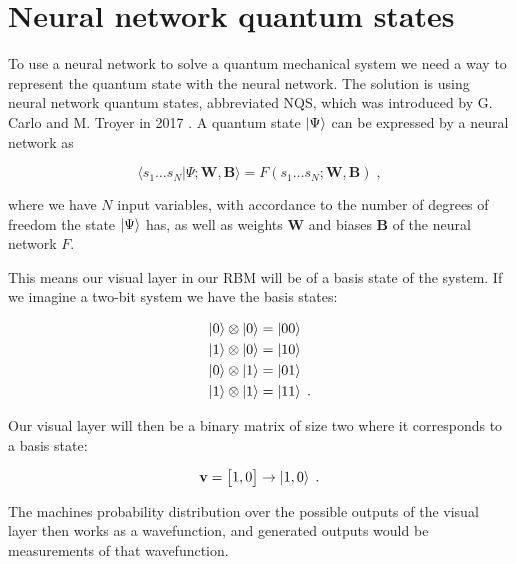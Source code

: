 \section{Neural network quantum states} \label{sec:nnqs} 

To use a neural network to solve a quantum mechanical system we need a way to represent the quantum state with the neural network. The solution is using neural network quantum states, abbreviated NQS, which was introduced by G. Carlo and M. Troyer in 2017 \cite{Carleo_2017}. A quantum state $\ket{\Psi}$ can be expressed by a neural network as

\begin{equation}
    \langle s_{1}\ldots s_{N}|\Psi ;\boldsymbol{W}, \boldsymbol{B}\rangle =F(s_{1}\ldots s_{N} ; \boldsymbol{W}, \boldsymbol{B} ) \; ,
\end{equation}

where we have $N$ input variables, with accordance to the number of degrees of freedom the state $\ket{\Psi}$ has, as well as weights $\boldsymbol{W}$ and biases $\boldsymbol{B}$ of the neural network $F$.
\\
\vspace{\baselineskip}

This means our visual layer in our RBM will be of a basis state of the system. If we imagine a two-bit system we have the basis states:

\begin{gather}
\begin{aligned}
    \ket{0} \otimes \ket{0} &= \ket{00} \\
    \ket{1} \otimes \ket{0} &= \ket{10} \\
    \ket{0} \otimes \ket{1} &= \ket{01} \\
    \ket{1} \otimes \ket{1} &= \ket{11} \; .
\end{aligned}
\end{gather}

Our visual layer will then be a binary matrix of size two where it corresponds to a basis state:

$$\mathbf{v} = \begin{bmatrix} 1, 0\end{bmatrix} \rightarrow \ket{1, 0} \; .$$

The machines probability distribution over the possible outputs of the visual layer then works as a wavefunction, and generated outputs would be measurements of that wavefunction.
